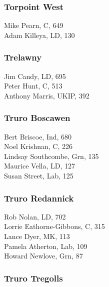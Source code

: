 \documentclass[a4paper,openany,10pt]{book}
\begin{document}
\subsubsection*{Torpoint West}



Mike Pearn, C, 649\\
Adam Killeya, LD, 130\\


\subsubsection*{Trelawny}



Jim Candy, LD, 695\\
Peter Hunt, C, 513\\
Anthony Marris, UKIP, 392\\


\subsubsection*{Truro Boscawen}



Bert Briscoe, Ind, 680\\
Noel Krishnan, C, 226\\
Lindsay Southcombe, Grn, 135\\
Maurice Vella, LD, 127\\
Susan Street, Lab, 125\\


\subsubsection*{Truro Redannick}



Rob Nolan, LD, 702\\
{Lorrie Eathorne-Gibbons}, C, 315\\
Lance Dyer, MK, 113\\
Pamela Atherton, Lab, 109\\
Howard Newlove, Grn, 87\\


\subsubsection*{Truro Tregolls}
\end{document}
